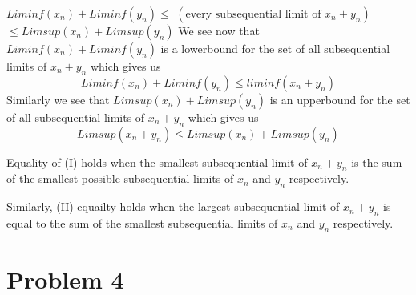 \documentclass[../Main.tex]{subfiles}
\begin{document}
$Liminf(x_n)+Liminf(y_n)\leq$ $(\text{every subsequential limit of } x_n+y_n)$ $\leq Limsup(x_n)+Limsup(y_n) $
We see now that $Liminf(x_n)+Liminf(y_n)$ is a lowerbound
for the set of all subsequential limits of $x_n+y_n$ 
which gives us $$Liminf(x_n)+Liminf(y_n)\leq liminf(x_n+y_n) $$
Similarly we see that $Limsup(x_n)+Limsup(y_n)$ is an upperbound
for the set of all subsequential limits of $x_n+y_n$
which gives us $$Limsup(x_n+y_n) \leq Limsup(x_n)+Limsup(y_n) $$

Equality of (I) holds when the smallest subsequential limit of $x_n+y_n$ is the sum
of the smallest possible subsequential limits of $x_n$ and $y_n$ respectively. 

Similarly, (II) equailty holds when the largest subsequential
limit of $x_n+y_n$ is equal to the sum of the smallest
subsequential limits of $x_n$ and $y_n$ respectively.

\section{Problem 4}
\end{document}
